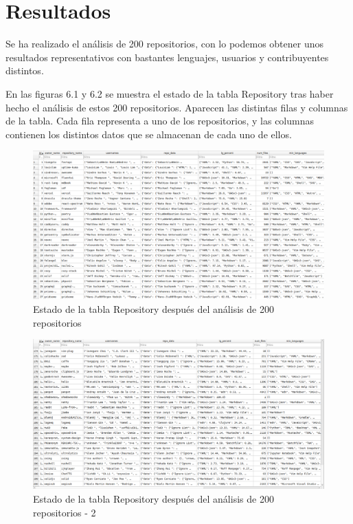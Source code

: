 \documentclass[a4paper, 12pt]{book}
\begin{document}
\cleardoublepage
\chapter{Resultados}
\label{chap:resultados}

Se ha realizado el análisis de 200 repositorios, con lo podemos obtener unos resultados representativos con bastantes lenguajes, usuarios y contribuyentes distintos.

En las figuras 6.1 y 6.2 se muestra el estado de la tabla Repository tras haber hecho el análisis de estos 200 repositorios. Aparecen las distintas filas y columnas de la tabla. Cada fila representa a uno de los repositorios, y las columnas contienen los distintos datos que se almacenan de cada uno de ellos.
\begin{figure}[H]
  \centering
  \includegraphics[width=1\textwidth]{img/tablarepo1.png}
  \caption{Estado de la tabla Repository después del análisis de 200 repositorios}
  \label{figura:repoafter1}
\end{figure}

\begin{figure}[H]
  \centering
  \includegraphics[width=1\textwidth]{img/tablarepo3.png}
  \caption{Estado de la tabla Repository después del análisis de 200 repositorios - 2}
  \label{figura:repoafter2}
\end{figure}
\end{document}
